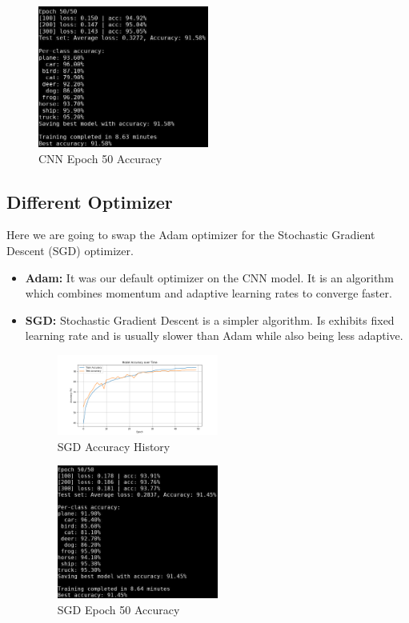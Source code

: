\begin{itemize}
\begin{figure}[H]
    \end{figure}
    \begin{figure}[H]
        \centering
        \includegraphics[width=0.5\textwidth]{media/cnn_epoch_50.png}
        \caption{CNN Epoch 50 Accuracy}
    \end{figure}
\end{itemize}

\subsection{Different Optimizer}
Here we are going to swap the Adam optimizer for the Stochastic Gradient Descent (SGD) optimizer.\\
\begin{itemize}
    \item \textbf{Adam:} It was our default optimizer on the CNN model. It is an algorithm which
    combines momentum and adaptive learning rates to converge faster. 
    \item \textbf{SGD:} Stochastic Gradient Descent is a simpler algorithm. Is exhibits fixed learning
    rate and is usually slower than Adam while also being less adaptive.
    \begin{figure}[H]
        \centering
        \includegraphics[width=0.5\textwidth]{media/cifar10_cnn_sgd_accuracy.png}
        \caption{SGD Accuracy History}
    \end{figure}
    \begin{figure}[H]
        \centering
        \includegraphics[width=0.5\textwidth]{media/cnn_sgd_epoch_50.png}
        \caption{SGD Epoch 50 Accuracy}
    \end{figure}
\end{itemize}

